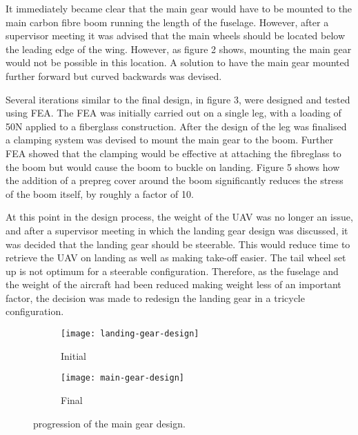 \documentclass[../../main.tex]{subfiles}
\begin{document}

It immediately became clear that the main gear would have to be mounted to the main carbon fibre boom running the length of the fuselage.
However, after a supervisor meeting it was advised that the main wheels should be located below the leading edge of the wing.
However, as figure 2 shows, mounting the main gear would not be possible in this location.
A solution to have the main gear mounted further forward but curved backwards was devised.  

Several iterations similar to the final design, in figure 3, were designed and tested using FEA.
The FEA was initially carried out on a single leg, with a loading of 50N applied to a fiberglass construction.
After the design of the leg was finalised a clamping system was devised to mount the main gear to the boom.
Further FEA showed that the clamping would be effective at attaching the fibreglass to the boom but would cause the boom to buckle on landing.
Figure 5 shows how the addition of a prepreg cover around the boom significantly reduces the stress of the boom itself, by roughly a factor of 10. 


At this point in the design process, the weight of the UAV was no longer an issue, and after a supervisor meeting in which the landing gear design was discussed, it was decided that the landing gear should be steerable.
This would reduce time to retrieve the UAV on landing as well as making take-off easier.
The tail wheel set up is not optimum for a steerable configuration.
Therefore, as the fuselage and the weight of the aircraft had been reduced making weight less of an important factor, the decision was made to redesign the landing gear in a tricycle configuration. 

\begin{figure}[H]
    \centering
    \begin{subfigure}[b]{0.33\columnwidth}
        \centering
        \texttt{[image: landing-gear-design]}
        \caption{Initial}
        \label{fig:main-gear-progression:initial}
    \end{subfigure}
    \hfill
    \begin{subfigure}[b]{0.49\columnwidth}
        \centering
        \texttt{[image: main-gear-design]}
        \caption{Final}
        \label{fig:main-gear-progression:final}
    \end{subfigure}
    
    \caption{progression of the main gear design.}
    \label{fig:main-gear-progression}
\end{figure}
\end{document}
